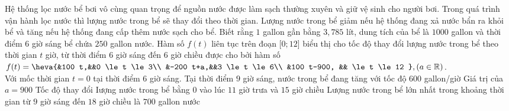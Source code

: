 \begin{ex}%
Hệ thống lọc nước bể bơi vô cùng quan trọng để nguồn nước được làm sạch thường xuyên và giữ vệ sinh cho người bơi. Trong quá trình vận hành lọc nước thì lượng nước trong bể sẽ thay đổi theo thời gian. Lượng nước trong bể giảm nếu hệ thống đang xả nước bẩn ra khỏi bể và tăng nếu hệ thống đang cấp thêm nước sạch cho bể. Biết rằng $1$ gallon gần bằng $3{,}785$ lít, dung tích của bể là $1000$ gallon và thời điểm $6$ giờ sáng bể chứa $250$ gallon nước. Hàm số $f(t)$ liên tục trên đoạn [$0;12$] biểu thị cho tốc độ thay đổi lượng nước trong bể theo thời gian $t$ giờ, từ thời điểm $6$ giờ sáng đến $6$ giờ chiều được cho bởi hàm số $
f (t)=\heva{&100 t,&&0 \le t \le 3\\
&-200 t+a,&&3 \le t \le 6\\
&100 t-900, && \le t \le 12
},(a \in\mathbb{R})$.\\
Với mốc thời gian $t=0$ tại thời điểm $6$ giờ sáng.
\choiceTF
{ Tại thời điểm $9$ giờ sáng, nước trong bể đang tăng với tốc độ $600$ gallon/giờ}
{\True Giá trị của $a=900$}
{Tốc độ thay đổi Iượng nước trong bể bằng $0$ vào lúc $11$ giờ trưa và $15$ giờ chiều}
{\True Lượng nước trong bể lớn nhất trong khoảng thời gian từ $9$ giờ sáng đến $18$ giờ chiều là $700$ gallon nước}
\end{ex}

